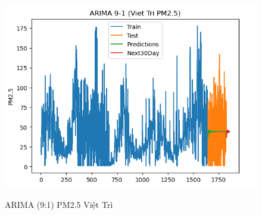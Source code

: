 \begin{figure}[h]
\begin{minipage}[b]{0.45\linewidth}
        \includegraphics[width=\linewidth]{img/ARIMA_9_1_VT.png}
        \caption{\scriptsize ARIMA (9:1) PM2.5 Việt Trì}
        \label{fig1}
    \end{minipage}\hfill
    \begin{minipage}[b]{0.45\linewidth}
        \centering
        \label{fig2}
    \end{minipage}
\end{figure}
